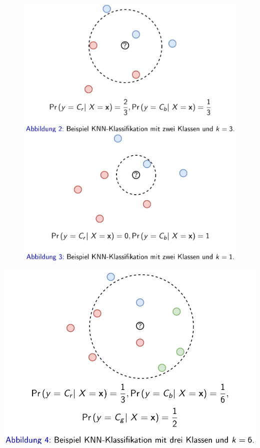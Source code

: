 \documentclass{report}
\begin{document}
\begin{figure}[H]
  \centering
  \begin{minipage}[b]{0.4\textwidth}
    \includegraphics[scale=.275]{ml05_2}
  \end{minipage}
  \hfill
  \begin{minipage}[b]{0.4\textwidth}
    \includegraphics[scale=.275]{ml05_3}
  \end{minipage}
\end{figure}

\begin{center}
  \includegraphics[scale=.275]{ml05_4}
\end{center}
\end{document}
